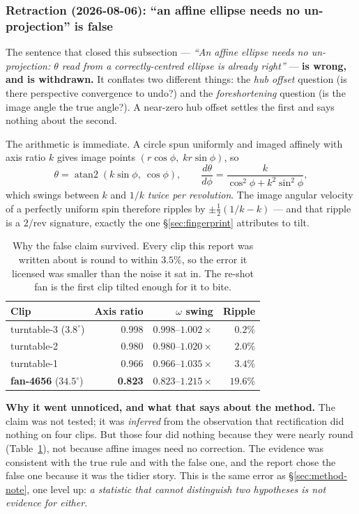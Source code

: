 \documentclass[11pt,a4paper]{article}
\begin{document}
\subsubsection*{Retraction (2026-08-06): ``an affine ellipse needs no un-projection'' is false}
\label{sec:affine-retract}

The sentence that closed this subsection --- \emph{``An affine ellipse needs no un-projection:
$\theta$ read from a correctly-centred ellipse is already right''} --- \textbf{is wrong, and is
withdrawn.} It conflates two different things: the \emph{hub offset} question (is there
perspective convergence to undo?) and the \emph{foreshortening} question (is the image angle the
true angle?). A near-zero hub offset settles the first and says nothing about the second.

The arithmetic is immediate. A circle spun uniformly and imaged affinely with axis ratio $k$
gives image points $(r\cos\phi,\; kr\sin\phi)$, so
\[
\theta = \operatorname{atan2}(k\sin\phi,\ \cos\phi),
\qquad
\frac{d\theta}{d\phi} = \frac{k}{\cos^{2}\phi + k^{2}\sin^{2}\phi},
\]
which swings between $k$ and $1/k$ \emph{twice per revolution}. The image angular velocity of a
perfectly uniform spin therefore ripples by $\pm\tfrac{1}{2}(1/k - k)$ --- and that ripple is a
$2/\mathrm{rev}$ signature, exactly the one \S\ref{sec:fingerprint} attributes to tilt.

\begin{table}[htbp]
\centering
\footnotesize
\begin{tabular}{lrrr}
\toprule
Clip & Axis ratio & $\omega$ swing & Ripple \\
\midrule
turntable-3 ($3.8^\circ$)      & 0.998 & $0.998$--$1.002\times$ & $0.2\%$ \\
turntable-2                    & 0.980 & $0.980$--$1.020\times$ & $2.0\%$ \\
turntable-1                    & 0.966 & $0.966$--$1.035\times$ & $3.4\%$ \\
\textbf{fan-4656} ($34.5^\circ$) & \textbf{0.823} & $0.823$--$1.215\times$ & $\mathbf{19.6\%}$ \\
\bottomrule
\end{tabular}
\caption{Why the false claim survived. Every clip this report was written about is round to
within $3.5\%$, so the error it licensed was smaller than the noise it sat in. The re-shot fan is
the first clip tilted enough for it to bite.}
\label{tab:affine-ripple}
\end{table}

\textbf{Why it went unnoticed, and what that says about the method.} The claim was not tested; it
was \emph{inferred} from the observation that rectification did nothing on four clips. But those
four did nothing because they were nearly round (Table~\ref{tab:affine-ripple}), not because
affine images need no correction. The evidence was consistent with the true rule and with the
false one, and the report chose the false one because it was the tidier story. This is the same
error as \S\ref{sec:method-note}, one level up: \emph{a statistic that cannot distinguish two
hypotheses is not evidence for either.}
\end{document}

